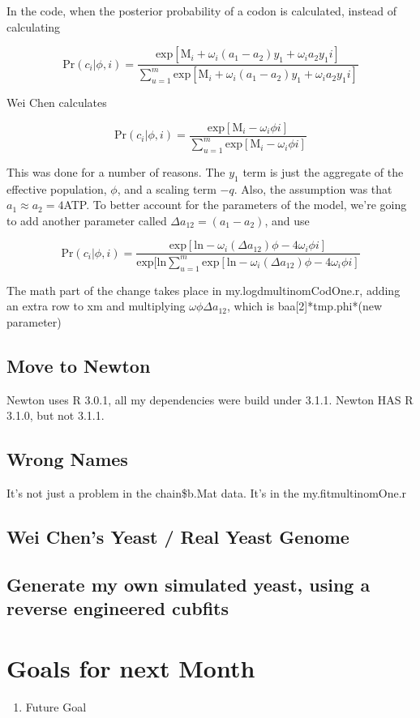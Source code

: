 In the code, when the posterior probability of a codon is calculated, instead of calculating

\[
\mbox{Pr}(c_i|\phi,i)
=
\frac{
\mbox{exp}[\mbox{M}_i
+ \omega_i(a_1-a_2)y_1
+ \omega_ia_2y_1 i
]
}{
\sum_{u=1}^m
\mbox{exp}[\mbox{M}_i
+ \omega_i(a_1-a_2)y_1
+ \omega_ia_2y_1 i
]
}
\]

Wei Chen calculates

\[
\mbox{Pr}(c_i|\phi,i)
=
\frac{
\mbox{exp}[\mbox{M}_i
- \omega_i\phi i
]
}{
\sum_{u=1}^m
\mbox{exp}[\mbox{M}_i
- \omega_i\phi i
]
}
\]

This was done for a number of reasons. The $y_1$ term is just the aggregate of the effective population, $\phi$, and a scaling term $-q$. Also, the assumption was that $a_1 \approx a_2 = 4$ATP.
To better account for the parameters of the model, we're going to add another parameter called $\Delta a_{12} = (a_1 - a_2)$, and use

\[
\mbox{Pr}(c_i|\phi,i)
=
\frac{
\mbox{exp}[\mbox{ln}
- \omega_i(\Delta a_{12})\phi
- 4\omega_i\phi i
]
}{
\mbox{exp}[\mbox{ln}
\sum_{u=1}^m
\mbox{exp}[\mbox{ln}
- \omega_i(\Delta a_{12})\phi
- 4\omega_i\phi i
]
}
\]

The math part of the change takes place in my.logdmultinomCodOne.r, adding an extra row to xm and multiplying $\omega\phi\Delta a_{12}$, which is baa[2]*tmp.phi*(new parameter)

\subsection{Move to Newton}

Newton uses R 3.0.1, all my dependencies were build under 3.1.1. Newton HAS R 3.1.0, but not 3.1.1.


\subsection{Wrong Names}

It's not just a problem in the chain\$b.Mat data. It's in the my.fitmultinomOne.r

\subsection{Wei Chen's Yeast / Real Yeast Genome}

\subsection{Generate my own simulated yeast, using a reverse engineered cubfits}



\section{Goals for next Month}
\begin{enumerate}
\item Future Goal
\end{enumerate}


